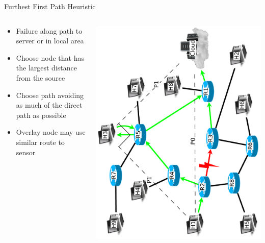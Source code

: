 \documentclass[pdftex]{beamer}
\begin{document}
\begin{frame}{Furthest First Path Heuristic}
\begin{columns}
\begin{column}{.5\textwidth}
\begin{itemize}
	\item Failure along path to server or in local area
	\item Choose node that has the largest distance from the source
	\item Choose path avoiding as much of the direct path as possible
	\item Overlay node may use similar route to sensor
\end{itemize}
\end{column}
	
\begin{column}{.5\textwidth}
\includegraphics[height=\textwidth,angle=-90]{angular_path}
\end{column}

\end{columns}
\end{frame}
\end{document}
